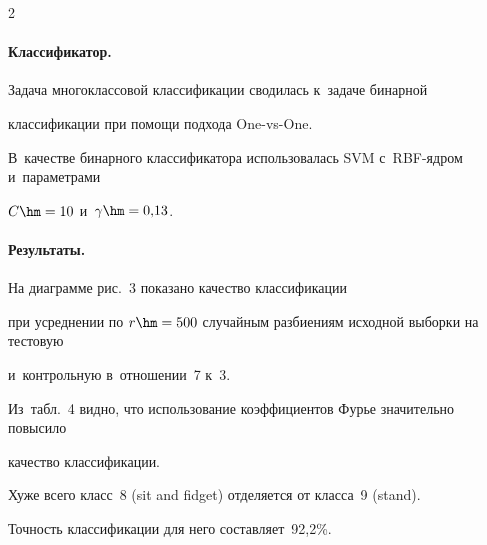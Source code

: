 \begin{multicols}{2}
\vspace*{-12pt}





\paragraph*{Классификатор.}


Задача многоклассовой классификации сводилась к~задаче бинарной 


классификации при помощи подхода One-vs-One.


В~качестве бинарного классификатора использовалась SVM с~RBF-яд\-ром и~параметрами 


$C\hm=10$ и~$\gamma\hm=0{,}13$.










\paragraph*{Результаты.}


На диаграмме рис.~3 показано качество классификации 


при усреднении по $r\hm=500$ случайным разбиениям исходной выборки на тес\-то\-вую 


и~контрольную в~отношении~7 к~3.




















Из~табл.~4 видно, что использование коэффициентов Фурье значительно повысило 


качество классификации.


Хуже всего класс~8 (sit and fidget) отделяется от класса~9 (stand).


Точность классификации для него составляет~92,2\%.





\vspace*{-6pt}









\end{multicols}
